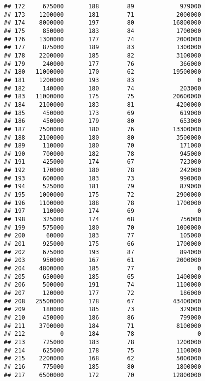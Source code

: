 \documentclass[
]{article}
\begin{document}
\begin{verbatim}
## 172     675000       188        89             979000
## 173    1200000       181        71            2000000
## 174    8000000       197        80           16800000
## 175     850000       183        84            1700000
## 176    1300000       177        74            2000000
## 177     875000       189        83            1300000
## 178    2200000       185        82            3100000
## 179     240000       177        76             366000
## 180   11000000       170        62           19500000
## 181    1200000       193        83                  0
## 182     140000       180        74             203000
## 183   11000000       175        75           20600000
## 184    2100000       183        81            4200000
## 185     450000       173        69             619000
## 186     450000       179        80             653000
## 187    7500000       180        76           13300000
## 188    2100000       180        80            3500000
## 189     110000       180        70             171000
## 190     700000       182        78             945000
## 191     425000       174        67             723000
## 192     170000       180        78             242000
## 193     600000       183        73             990000
## 194     525000       181        79             879000
## 195    1000000       175        72            2900000
## 196    1100000       188        78            1700000
## 197     110000       174        69                  0
## 198     325000       174        68             756000
## 199     575000       180        70            1000000
## 200      60000       183        77             105000
## 201     925000       175        66            1700000
## 202     675000       193        87             894000
## 203     950000       167        61            2000000
## 204    4800000       185        77                  0
## 205     650000       185        65            1400000
## 206     500000       191        74            1100000
## 207     120000       177        72             186000
## 208   25500000       178        67           43400000
## 209     180000       185        73             329000
## 210     450000       186        86             799000
## 211    3700000       184        71            8100000
## 212          0       184        78                  0
## 213     725000       183        78            1200000
## 214     625000       178        75            1100000
## 215    2200000       168        62            5000000
## 216     775000       185        80            1800000
## 217    6500000       172        70           12800000

\end{verbatim}
\end{document}
